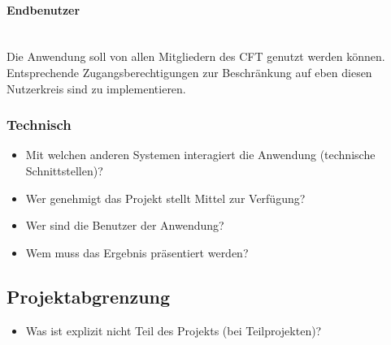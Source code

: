 \paragraph{Endbenutzer} ~\\
\label{p:Endbenutzer}
Die Anwendung \projektName soll von allen Mitgliedern des \ac{CFT} \teamName genutzt werden können. Entsprechende Zugangsberechtigungen zur Beschränkung auf eben diesen Nutzerkreis sind zu implementieren.

\subsubsection{Technisch} 
\label{sec:Projektschnittstellen:Technisch}



\begin{itemize}
	\item Mit welchen anderen Systemen interagiert die Anwendung (technische Schnittstellen)? 
	\item Wer genehmigt das Projekt \bzw stellt Mittel zur Verfügung? 
	\item Wer sind die Benutzer der Anwendung?
	\item Wem muss das Ergebnis präsentiert werden?
\end{itemize}


\subsection{Projektabgrenzung} 
\label{sec:Projektabgrenzung}
\begin{itemize}
	\item Was ist explizit nicht Teil des Projekts (\insb bei Teilprojekten)?
\end{itemize}
